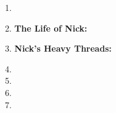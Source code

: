 \documentclass[11pt]{article}
\begin{document}
\begin{enumerate}
\item 

\item {\bf The Life of Nick:}
    

\item {\bf Nick's Heavy Threads:}
	

\pagebreak
\item 

\item 

\item 

\pagebreak
\item 

\end{enumerate}
\end{document}
